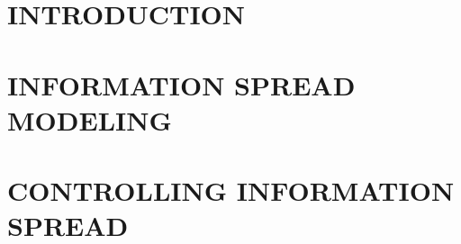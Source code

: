 \documentclass[oneside,12pt]{book}
\theoremstyle{definition}%
\begin{document}
\newpage \setcounter{page}{3} %
  
\tableofcontents %
\listoftables {}%
\listoffigures {}%


\newpage %

\part{INTRODUCTION}
\part{INFORMATION SPREAD MODELING}
\part{CONTROLLING INFORMATION SPREAD}


%




\end{document}
